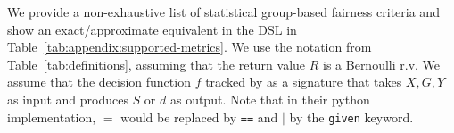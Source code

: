 \begin{subappendices}
We provide a non-exhaustive list of statistical group-based fairness criteria and show an exact/approximate equivalent in the \AVOIRmethodname{} DSL in Table~\ref{tab:appendix:supported-metrics}.
We use the notation from Table~\ref{tab:definitions}, assuming that the return value $R$ is a Bernoulli r.v.
We assume that the decision function $f$ tracked by \AVOIRmethodname{} as a signature that takes $X, G, Y$ as input and produces $S$ or $d$ as output.
Note that in their python implementation, $=$ would be replaced by \lstinline{==} and $|$ by the \lstinline{given} keyword.
\begin{comment}
\begin{itemize}
    \item[$G$:] Protected or sensitive attribute. For demonstration purposes, we will use the values $m$ and $f$ to denote majority and minorty classes.
    \item[$X$:] Features describing each individual 
    \item[$Y$:] True label for $X$
    \item[$S$:] Probability $\Pr[Y|X, G]$ predicted for a certain class $c$
    \item[$d$:] Predicted decision for $X$, usually derived from $X$
    \item[$c$:] A threshold to test the specification. For ratios based approximations, this would be a number $1 \pm \eps$ for some small $\eps > 0$. For difference based approxiamtions, this number would be some small $\eps > 0$. When multiple terms are present, we use $c_i$ to denote the $i^{\text{th}}$ threshold.
\end{itemize}
\end{comment}

\end{subappendices}
